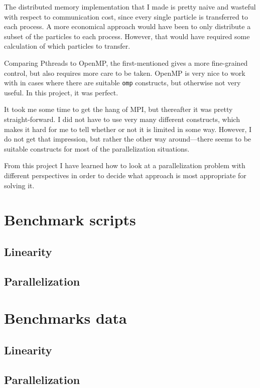 \documentclass[12pt,a4paper]{article}
\begin{document}
The distributed memory implementation that I made is pretty naive and wasteful
with respect to communication cost, since every single particle is transferred
to each process. A more economical approach would have been to only distribute
a subset of the particles to each process. However, that would have required
some calculation of which particles to transfer.

Comparing Pthreads to OpenMP, the first-mentioned gives a more fine-grained
control, but also requires more care to be taken. OpenMP is very nice to work
with in cases where there are suitable \texttt{omp} constructs, but otherwise
not very useful. In this project, it was perfect. 

It took me some time to get the hang of MPI, but thereafter it was pretty
straight-forward. I did not have to use very many different constructs, which
makes it hard for me to tell whether or not it is limited in some way. However,
I do not get that impression, but rather the other way around---there seems to
be suitable constructs for most of the parallelization situations.

From this project I have learned how to look at a parallelization problem with
different perspectives in order to decide what approach is most appropriate for
solving it.



\appendix

\section{Benchmark scripts}
\label{sec:appendixBenchmarkScripts}

\subsection{Linearity}


\subsection{Parallelization}



\section{Benchmarks data} 

\subsection{Linearity}






\subsection{Parallelization}




\end{document}
